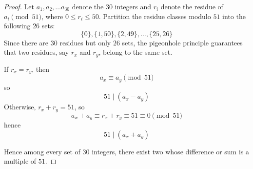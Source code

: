 \documentclass{article}
\begin{document}
\begin{proof}
    Let $a_1, a_2, \dots a_{30}$ denote the $30$ integers and $r_i$ denote the residue of 
    $a_i \pmod{51}$, where $0 \le r_i \le 50$. Partition the residue classes modulo $51$ into the 
    following $26$ sets:
    \[
    \{0\}, \{1, 50\}, \{2, 49\}, \dots, \{25, 26\}
    \]
    Since there are $30$ residues but only $26$ sets, the pigeonhole principle guarantees that two 
    residues, say $r_x$ and $r_y$, belong to the same set.

    \medskip

    If $r_x = r_y$, then
    \[
    a_x \equiv a_y \pmod{51}
    \]
    so
    \[
    51 \mid (a_x - a_y)
    \]
    Otherwise, $r_x + r_y = 51$, so
    \[
    a_x + a_y \equiv r_x + r_y \equiv 51 \equiv 0 \pmod{51}
    \]
    hence
    \[
    51 \mid (a_x + a_y)
    \]

    \medskip

    Hence among every set of $30$ integers, there exist two whose difference or sum is a multiple of $51$.
\end{proof}
\end{document}
